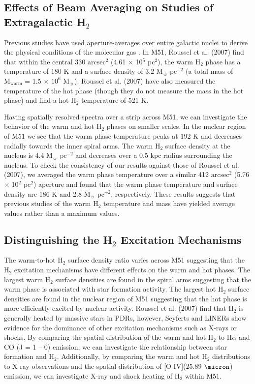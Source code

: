\documentclass[12pt,preprint]{aastex}
\begin{document}
\subsection{Effects of Beam Averaging on Studies of Extragalactic H$_2$}

Previous studies have used aperture-averages over entire galactic
nuclei to derive the physical conditions of the molecular gas
\citep{rig02, hig06, rou07}.  In M51, Roussel et al. (2007) find that within
the central 330 $\mathrm{arcsec^2}$ (4.61 $\times$ 10$^5$ pc$^2$),
the warm H$_2$ phase has a temperature of 180 K and 
a surface density of 3.2 $\mathrm{M_\sun}$ $\mathrm{pc^{-2}}$ 
(a total mass of $\mathrm{M_{warm}}$ = 1.5 $\times$ $\mathrm{10^6}$
$\mathrm{M_\sun}$).  Roussel et al. (2007) have also measured the temperature of
the hot phase (though they do not measure the mass in the hot phase)
and find a hot H$_2$ temperature of 521 K.

Having spatially resolved spectra over a strip across M51, we can 
investigate the behavior of the warm and hot H$_2$ phases 
on smaller scales.  In the nuclear region of M51 we see that the 
warm phase temperature peaks at 192 K and decreases 
radially towards the inner spiral arms.  The warm H$_2$ surface 
density at the nucleus is 4.4 $\mathrm{M_\sun}$ $\mathrm{pc^{-2}}$ 
and decreases over a 0.5 kpc radius surrounding the 
nucleus.  To check the consistency of 
our results against those of Roussel et al. (2007), we averaged the 
warm phase temperature over a similar 412 
$\mathrm{arcsec^2}$ (5.76 $\times$ 10$^2$ pc$^2$) aperture and
found that the warm phase temperature and surface density are
186 K and 2.8 $\mathrm{M_\sun}$ $\mathrm{pc^{-2}}$, 
respectively.  These results suggests that previous studies 
of the warm H$_2$ temperature and mass have yielded average 
values rather than a maximum values.

\subsection{Distinguishing the H$_2$ Excitation Mechanisms}

The warm-to-hot H$_2$ surface density ratio varies across 
M51 suggesting that the H$_2$ excitation mechanisms 
have different effects on the warm and hot phases. 
The largest warm H$_2$ surface densities are found in 
the spiral arms suggesting that the warm phase is 
associated with star formation activity.  The largest 
hot H$_2$ surface densities are found in the nuclear 
region of M51 suggesting that the hot phase is more 
efficiently excited by nuclear activity. Roussel et al. (2007) 
find that H$_2$ is generally heated by massive stars in 
PDRs, however, Seyferts and LINERs show evidence for 
the dominance of other excitation mechanisms such as 
X-rays or shocks.  By comparing the spatial distribution 
of the warm and hot H$_2$ to H$\alpha$ and CO 
(J = 1 -- 0) emission, we can investigate the relationship 
between star formation and H$_2$.  Additionally, by 
comparing the warm and hot H$_2$ distributions to X-ray 
observations and the spatial distribution of [O IV](25.89 $\micron$) 
emission, we can investigate X-ray and shock heating 
of H$_2$ within M51.
\end{document}
